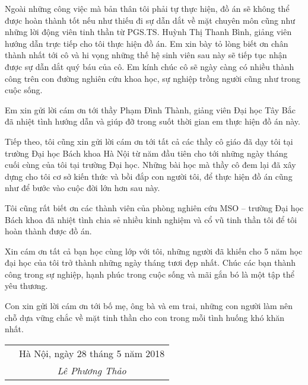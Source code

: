 \fontsize{12}{16}\selectfont 

Ngoài những công việc mà bản thân tôi phải tự thực hiện, đồ án sẽ không thể được hoàn thành tốt nếu như thiếu đi sự dẫn dắt về mặt chuyên môn cũng như những lời động viên tinh thần từ PGS.TS. Huỳnh Thị Thanh Bình, giảng viên hướng dẫn trực tiếp cho tôi thực hiện đồ án. Em xin bày tỏ lòng biết ơn chân thành nhất tới cô và hi vọng những thế hệ sinh viên sau này sẽ tiếp tục nhận được sự dẫn dắt quý báu của cô. Em kính chúc cô sẽ ngày càng có nhiều thành công trên con đường nghiên cứu khoa học, sự nghiệp trồng người cũng như trong cuộc sống.

Em xin gửi lời cám ơn tới thầy Phạm Đình Thành, giảng viên Đại học Tây Bắc đã nhiệt tình hướng dẫn và giúp đỡ trong suốt thời gian em thực hiện đồ án này.

Tiếp theo, tôi cũng xin gửi lời cám ơn tới tất cả các thầy cô giáo đã dạy tôi tại trường Đại học Bách khoa Hà Nội từ năm đầu tiên cho tới những ngày tháng cuối cùng của tôi tại trường Đại học. Những bài học mà thầy cô đem lại đã xây dựng cho tôi cơ sở kiến thức và bồi đắp con người tôi, để thực hiện đồ án cũng như để bước vào cuộc đời lớn hơn sau này.

Tôi cũng rất biết ơn các thành viên của phòng nghiên cứu MSO – trường Đại học Bách khoa đã nhiệt tình chia sẻ nhiều kinh nghiệm và cổ vũ tinh thần tôi để tôi hoàn thành được đồ án.

Xin cám ơn tất cả bạn học cùng lớp với tôi, những người đã khiến cho 5 năm học đại học của tôi trở thành những ngày tháng tươi đẹp nhất. Chúc các bạn thành công trong sự nghiệp, hạnh phúc trong cuộc sống và mãi gắn bó là một tập thể yêu thương.

Con xin gửi lời cám ơn tới bố mẹ, ông bà và em trai, những con người làm nên chỗ dựa vững chắc về mặt tinh thần cho con trong mỗi tình huống khó khăn nhất.

	
\noindent
\begin{tabularx}{\textwidth}{X c}
	& Hà Nội, ngày 28 tháng 5 năm 2018 \\ 
	& \textit{Lê Phương Thảo}
\end{tabularx} 
